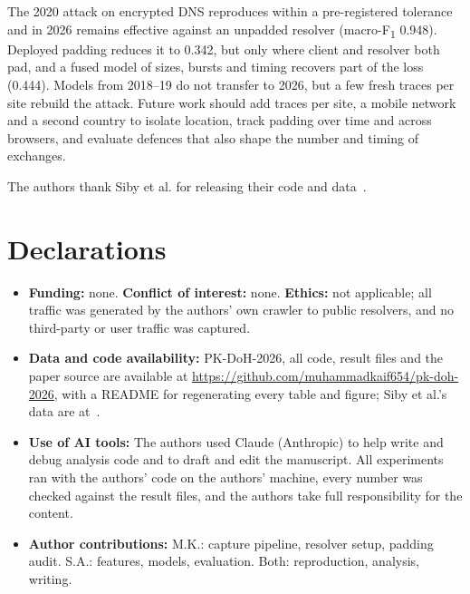 \documentclass[pdflatex,sn-mathphys-num]{sn-jnl}
\newcommand{\Fone}{F\textsubscript{1}}
\begin{document}
The 2020 attack on encrypted DNS reproduces within a pre-registered tolerance and in 2026 remains effective against an unpadded resolver (macro-\Fone{} 0.948). Deployed padding reduces it to 0.342, but only where client and resolver both pad, and a fused model of sizes, bursts and timing recovers part of the loss (0.444). Models from 2018--19 do not transfer to 2026, but a few fresh traces per site rebuild the attack. Future work should add traces per site, a mobile network and a second country to isolate location, track padding over time and across browsers, and evaluate defences that also shape the number and timing of exchanges.

\backmatter

 The authors thank Siby et al. for releasing their code and data~\cite{sibycode}.

\section*{Declarations}
\begin{itemize}
\item \textbf{Funding:} none. \textbf{Conflict of interest:} none. \textbf{Ethics:} not applicable; all traffic was generated by the authors' own crawler to public resolvers, and no third-party or user traffic was captured.
\item \textbf{Data and code availability:} PK-DoH-2026, all code, result files and the paper source are available at \url{https://github.com/muhammadkaif654/pk-doh-2026}, with a README for regenerating every table and figure; Siby et al.'s data are at~\cite{sibycode}.
\item \textbf{Use of AI tools:} The authors used Claude (Anthropic) to help write and debug analysis code and to draft and edit the manuscript. All experiments ran with the authors' code on the authors' machine, every number was checked against the result files, and the authors take full responsibility for the content.
\item \textbf{Author contributions:} M.K.: capture pipeline, resolver setup, padding audit. S.A.: features, models, evaluation. Both: reproduction, analysis, writing.
\end{itemize}
\end{document}
